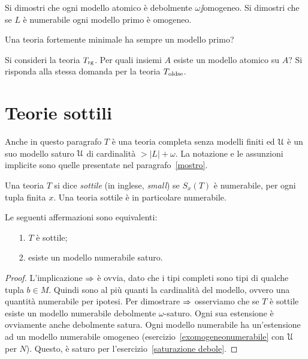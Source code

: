 \begin{exercise}
Si dimostri che ogni modello atomico \`e debolmente $\omega\jj$omogeneo. Si dimostri che se $L$ \`e numerabile ogni modello primo \`e omogeneo.\QED
\end{exercise}

\begin{exercise} 
Una teoria fortemente minimale ha sempre un modello primo?\QED
\end{exercise}

\begin{exercise}
Si consideri la teoria $T_{\rm rg}$. Per quali insiemi $A$ esiste un modello atomico su $A$? Si risponda alla stessa domanda per la teoria $T_{\rm oldse}$.\QED
\end{exercise}

\section{Teorie sottili}

Anche in  questo paragrafo $T$ \`e una teoria completa senza modelli finiti ed $\EuScript U$ \`e un suo modello saturo $\EuScript U$ di cardinalit\`a $>|L|+\omega$. La notazione e le assunzioni implicite sono quelle presentate nel paragrafo~\ref{mostro}.

Una teoria $T$ si dice \emph{sottile\/} (in inglese, \emph{small\/}) se $S_x(T)$ \`e numerabile, per ogni tupla finita $x$. Una teoria sottile \`e in particolare numerabile.

\begin{proposition}\label{prop_small_countable_saturated}
Le seguenti affermazioni sono equivalenti:
\begin{itemize}
\item[1.] $T$ \`e sottile;
\item[2.] esiste un modello numerabile saturo.
\end{itemize}
\end{proposition}
\begin{proof}
L'implicazione $\Rightarrow$ \`e ovvia, dato che i tipi completi sono tipi di qualche tupla $b \in M$. Quindi sono al pi\`u quanti la cardinalit\`a del modello, ovvero una quantit\`a numerabile per ipotesi. Per dimostrare  $\Rightarrow$ osserviamo che se $T$ \`e sottile esiste un modello numerabile debolmente $\omega$-saturo. Ogni sua estensione \`e ovviamente anche  debolmente satura.  Ogni modello numerabile ha un'estensione ad un modello numerabile omogeneo (esercizio~\ref{exomogeneonumerabile} con $\EuScript U$ per $N$). Questo, \`e saturo per l'esercizio~\ref{saturazione debole}.
\end{proof}

